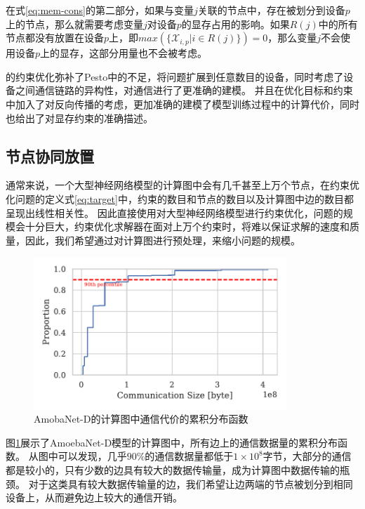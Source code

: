 在式\ref{eq:mem-cons}的第二部分，如果与变量$j$关联的节点中，存在被划分到设备$p$上的节点，那么就需要考虑变量$j$对设备$p$的显存占用的影响。如果$R(j)$中的所有节点都没有放置在设备$p$上，即$\mathit{max}(\{\mathcal{X}_{i,p} |  i\in R(j)\})=0$，那么变量$j$不会使用设备$p$上的显存，这部分用量也不会被考虑。

\sys{}的约束优化弥补了Pesto中的不足，将问题扩展到任意数目的设备，同时考虑了设备之间通信链路的异构性，对通信进行了更准确的建模。
并且\sys{}在优化目标和约束中加入了对反向传播的考虑，更加准确的建模了模型训练过程中的计算代价，同时也给出了对显存约束的准确描述。

\subsection{节点协同放置}
\label{sec:co-place}
通常来说，一个大型神经网络模型的计算图中会有几千甚至上万个节点，在约束优化问题的定义式\ref{eq:target}中，约束的数目和节点的数目以及计算图中边的数目都呈现出线性相关性。
因此直接使用对大型神经网络模型进行约束优化，问题的规模会十分巨大，约束优化求解器在面对上万个约束时，将难以保证求解的速度和质量，因此，我们希望通过对计算图进行预处理，来缩小问题的规模。


\begin{figure}[h]
	\centering
	\includegraphics[width=0.85\textwidth]{./figure/4-alg/commmu_cdf.pdf}
	\caption{AmobaNet-D的计算图中通信代价的累积分布函数}
	\label{fig:commu-cdf}
\end{figure}

图\ref{fig:commu-cdf}展示了AmoebaNet-D模型的计算图中，所有边上的通信数据量的累积分布函数。
从图中可以发现，几乎$90\%$的通信数据量都低于$1\times 10^8$字节，大部分的通信都是较小的，只有少数的边具有较大的数据传输量，成为计算图中数据传输的瓶颈。
对于这类具有较大数据传输量的边，我们希望让边两端的节点被划分到相同设备上，从而避免边上较大的通信开销。


